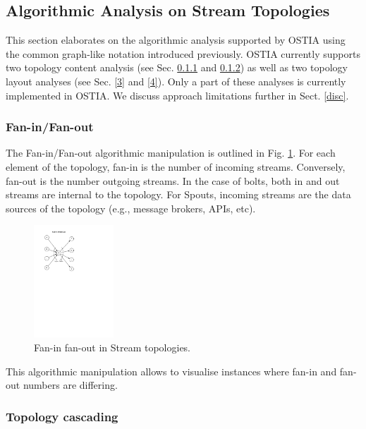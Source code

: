 \subsection{Algorithmic Analysis on Stream Topologies}\label{algo}

This section elaborates on the algorithmic analysis supported by OSTIA using the common graph-like notation introduced previously. OSTIA currently supports two topology content analysis (see Sec. \ref{1} and \ref{2}) as well as two topology layout analyses (see Sec. \ref{3} and \ref{4}). Only a part of these analyses is currently implemented in OSTIA. We discuss approach limitations further in Sect. \ref{disc}.

\subsubsection{Fan-in/Fan-out}\label{1}

The Fan-in/Fan-out algorithmic manipulation is outlined in Fig. \ref{fig:fan}. For each element of the topology, fan-in is the number of incoming
streams. Conversely, fan-out is the number outgoing streams. In the case of
bolts, both in and out streams are internal to the topology. For Spouts,
incoming streams are the data sources of the topology (e.g., message brokers,
APIs, etc).

\begin{figure}
	\begin{center}
		\includegraphics[width=3cm]{images/fan-in-out}
		\caption{Fan-in fan-out in Stream topologies.}
		\label{fig:fan}
	\end{center}
\end{figure}

This algorithmic manipulation allows to visualise instances where fan-in and fan-out numbers are differing.

\subsubsection{Topology cascading}\label{2}

